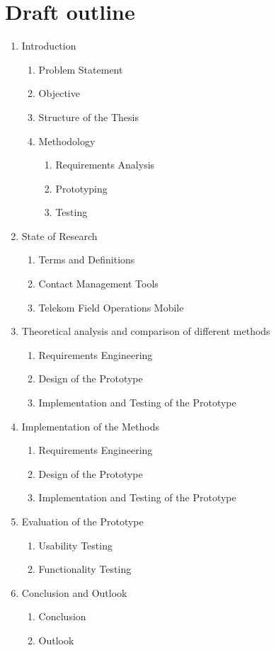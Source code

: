 \newpage
\section{Draft outline}


\begin{enumerate}
    \item Introduction
    \begin{enumerate}
        \item Problem Statement
        \item Objective
        \item Structure of the Thesis
        \item Methodology
        \begin{enumerate}
            \item Requirements Analysis
            \item Prototyping
            \item Testing
        \end{enumerate}
    \end{enumerate}
    \item State of Research
    \begin{enumerate}
        \item Terms and Definitions
        \item Contact Management Tools
        \item Telekom Field Operations Mobile
    \end{enumerate}
    \item Theoretical analysis and comparison of different methods
    \begin{enumerate}
        \item Requirements Engineering
        \item Design of the Prototype
        \item Implementation and Testing of the Prototype
    \end{enumerate}
    \item Implementation of the Methods
    \begin{enumerate}
        \item Requirements Engineering
        \item Design of the Prototype
        \item Implementation and Testing of the Prototype
    \end{enumerate}
    \item Evaluation of the Prototype
    \begin{enumerate}
        \item Usability Testing
        \item Functionality Testing
    \end{enumerate}
    \item Conclusion and Outlook
    \begin{enumerate}
        \item Conclusion
        \item Outlook
    \end{enumerate}
\end{enumerate}


